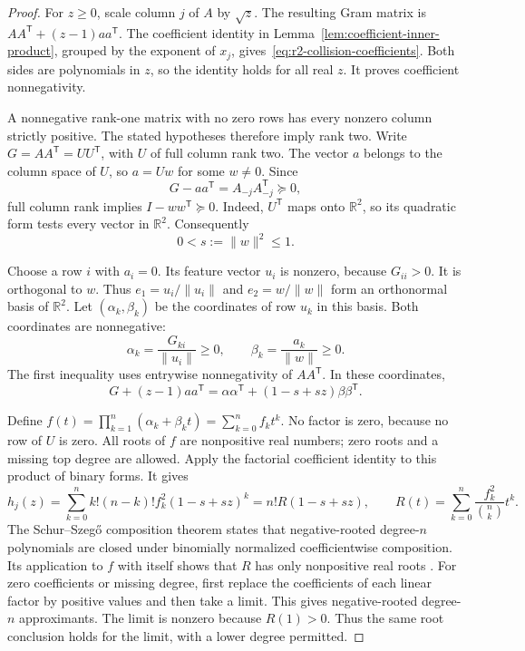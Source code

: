 \documentclass[11pt,a4paper]{article}
\theoremstyle{definition}
\theoremstyle{remark}
\newcommand{\R}{\mathbb{R}}
\newcommand{\T}{\mathsf{T}}
\begin{document}
\begin{proof}
For $z\ge0$, scale column $j$ of $A$ by $\sqrt z$.
The resulting Gram matrix is $AA^\T+(z-1)aa^\T$.
The coefficient identity in Lemma~\ref{lem:coefficient-inner-product}, grouped by the exponent of $x_j$, gives~\eqref{eq:r2-collision-coefficients}.
Both sides are polynomials in $z$, so the identity holds for all real $z$.
It proves coefficient nonnegativity.

A nonnegative rank-one matrix with no zero rows has every nonzero column strictly positive.
The stated hypotheses therefore imply rank two.
Write $G=AA^\T=UU^\T$, with $U$ of full column rank two.
The vector $a$ belongs to the column space of $U$, so $a=Uw$ for some $w\ne0$.
Since
\[
 G-aa^\T=A_{-j}A_{-j}^\T\succeq0,
\]
full column rank implies $I-ww^\T\succeq0$.
Indeed, $U^\T$ maps onto $\R^2$, so its quadratic form tests every vector in $\R^2$.
Consequently
\begin{equation}\label{eq:r2-collision-s}
 0<s:=\|w\|^2\le1.
\end{equation}

Choose a row $i$ with $a_i=0$.
Its feature vector $u_i$ is nonzero, because $G_{ii}>0$.
It is orthogonal to $w$.
Thus $e_1=u_i/\|u_i\|$ and $e_2=w/\|w\|$ form an orthonormal basis of $\R^2$.
Let $(\alpha_k,\beta_k)$ be the coordinates of row $u_k$ in this basis.
Both coordinates are nonnegative:
\[
 \alpha_k=\frac{G_{ki}}{\|u_i\|}\ge0,
 \qquad \beta_k=\frac{a_k}{\|w\|}\ge0.
\]
The first inequality uses entrywise nonnegativity of $AA^\T$.
In these coordinates,
\begin{equation}\label{eq:r2-collision-binary-gram}
 G+(z-1)aa^\T=\alpha\alpha^\T+(1-s+sz)\beta\beta^\T.
\end{equation}

Define $f(t)=\prod_{k=1}^n(\alpha_k+\beta_k t)=\sum_{k=0}^n f_kt^k$.
No factor is zero, because no row of $U$ is zero.
All roots of $f$ are nonpositive real numbers; zero roots and a missing top degree are allowed.
Apply the factorial coefficient identity to this product of binary forms.
It gives
\begin{equation}\label{eq:r2-collision-binary-sum}
 h_j(z)=\sum_{k=0}^n k!(n-k)!f_k^2(1-s+sz)^k
 =n!R(1-s+sz),
 \qquad R(t)=\sum_{k=0}^n\frac{f_k^2}{\binom nk}t^k.
\end{equation}
The Schur--Szeg\H{o} composition theorem states that negative-rooted degree-$n$ polynomials are closed under binomially normalized coefficientwise composition.
Its application to $f$ with itself shows that $R$ has only nonpositive real roots
\cite[Proposition~1.5]{kostov-shapiro2006}.
For zero coefficients or missing degree, first replace the coefficients of each linear factor by positive values and then take a limit.
This gives negative-rooted degree-$n$ approximants.
The limit is nonzero because $R(1)>0$.
Thus the same root conclusion holds for the limit, with a lower degree permitted.


\end{proof}
\end{document}
